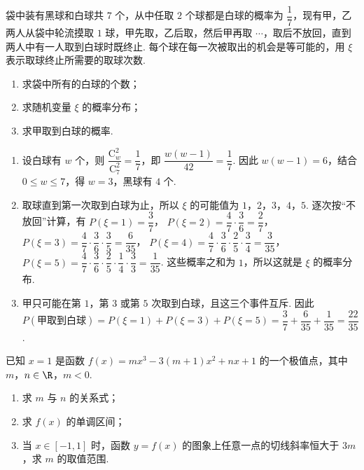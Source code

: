 \begin{problem}
袋中装有黑球和白球共 \(7\) 个，从中任取 \(2\) 个球都是白球的概率为 \(\dfrac{1}{7}\)，现有甲，乙两人从袋中轮流摸取 \(1\) 球，甲先取，乙后取，然后甲再取 \(\cdots\)，取后不放回，直到两人中有一人取到白球时既终止. 每个球在每一次被取出的机会是等可能的，用 \(\xi\) 表示取球终止所需要的取球次数.

\begin{enumerate}
\item 求袋中所有的白球的个数；
\item 求随机变量 \(\xi\) 的概率分布；
\item 求甲取到白球的概率.
\end{enumerate}
\end{problem}

\begin{solution}
\begin{enumerate}
\item
设白球有 \(w\) 个，则
\(\dfrac{\mathrm C_w^2}{\mathrm C_7^2}=\dfrac{1}{7}\)，即 \(\dfrac{w(w-1)}{42}=\dfrac{1}{7}\). 因此 \(w(w-1)=6\)，结合 \(0\leqslant w\leqslant7\)，得 \(w=3\)，黑球有 \(4\) 个.

\item
取球直到第一次取到白球为止，所以 \(\xi\) 的可能值为 \(1\)，\(2\)，\(3\)，\(4\)，\(5\). 逐次按“不放回”计算，有
\(P(\xi=1)=\dfrac{3}{7}\)，
\(P(\xi=2)=\dfrac{4}{7}\cdot\dfrac{3}{6}=\dfrac{2}{7}\)，
\(P(\xi=3)=\dfrac{4}{7}\cdot\dfrac{3}{6}\cdot\dfrac{3}{5}=\dfrac{6}{35}\)，
\(P(\xi=4)=\dfrac{4}{7}\cdot\dfrac{3}{6}\cdot\dfrac{2}{5}\cdot\dfrac{3}{4}=\dfrac{3}{35}\)，
\(P(\xi=5)=\dfrac{4}{7}\cdot\dfrac{3}{6}\cdot\dfrac{2}{5}\cdot\dfrac{1}{4}\cdot\dfrac{3}{3}=\dfrac{1}{35}\). 这些概率之和为 \(1\)，所以这就是 \(\xi\) 的概率分布.

\item
甲只可能在第 \(1\)，第 \(3\) 或第 \(5\) 次取到白球，且这三个事件互斥. 因此
\(P(\text{甲取到白球})=P(\xi=1)+P(\xi=3)+P(\xi=5)=\dfrac{3}{7}+\dfrac{6}{35}+\dfrac{1}{35}=\dfrac{22}{35}\).
\end{enumerate}
\end{solution}

\begin{problem}
已知 \(x=1\) 是函数 \(f(x)=mx^3-3(m+1)x^2+nx+1\) 的一个极值点，其中 \(m\)，\(n\in\R\)，\(m<0\).

\begin{enumerate}
\item 求 \(m\) 与 \(n\) 的关系式；
\item 求 \(f(x)\) 的单调区间；
\item 当 \(x\in[-1,1]\) 时，函数 \(y=f(x)\) 的图象上任意一点的切线斜率恒大于 \(3m\)，求 \(m\) 的取值范围.
\end{enumerate}
\end{problem}

